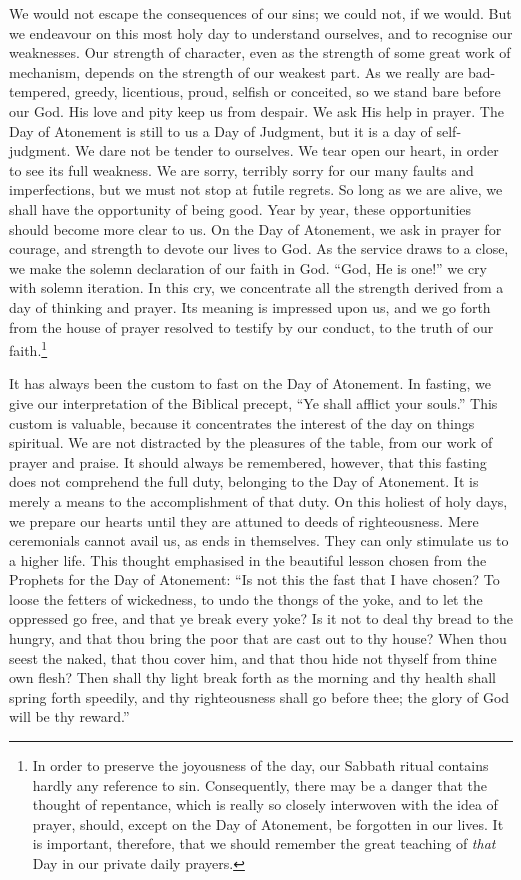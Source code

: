 We would not escape the consequences of
our sins; we could not, if we would. But
we endeavour on this most holy day to understand
ourselves, and to recognise our
weaknesses. Our strength of character, even as
the strength of some great work of mechanism,
depends on the strength of our weakest part.
As we really are bad-tempered, greedy,
licentious, proud, selfish or conceited, so we
stand bare before our God. His love and
pity keep us from despair. We ask His
help in prayer. The Day of Atonement is
still to us a Day of Judgment, but it is a day
of self-judgment. We dare not be tender to
ourselves. We tear open our heart, in order
to see its full weakness. We are sorry,
terribly sorry for our many faults and imperfections,
but we must not stop at futile
regrets. So long as we are alive, we shall
have the opportunity of being good. Year by
year, these opportunities should become more
clear to us. On the Day of Atonement, we
ask in prayer for courage, and strength to
devote our lives to God. As the service
draws to a close, we make the solemn
declaration of our faith in God. “God, He
is one!” we cry with solemn iteration. In
this cry, we concentrate all the strength
derived from a day of thinking and prayer.
Its meaning is impressed upon us, and we
go forth from the house of prayer resolved
to testify by our conduct, to the truth of
our faith.\footnote{In order to preserve the
joyousness of the day, our Sabbath ritual
contains hardly any reference to sin. Consequently,
there may be a danger that the thought of repentance,
which is really so closely interwoven with the idea of
prayer, should, except on the Day of Atonement, be forgotten
in our lives. It is important, therefore, that we should remember
the great teaching of \textsl{that} Day in our private daily
prayers.}

It has always been the custom to fast on the
Day of Atonement. In fasting, we give our interpretation
of the Biblical precept, “Ye shall
afflict your souls.” This custom is valuable,
because it concentrates the interest of the day
on things spiritual. We are not distracted
by the pleasures of the table, from our work
of prayer and praise. It should always be
remembered, however, that this fasting does
not comprehend the full duty, belonging to
the Day of Atonement. It is merely a
means to the accomplishment of that duty.
On this holiest of holy days, we prepare our
hearts until they are attuned to deeds of
righteousness. Mere ceremonials cannot
avail us, as ends in themselves. They can
only stimulate us to a higher life. This thought
emphasised in the beautiful lesson chosen
from the Prophets for the Day of Atonement:
“Is not this the fast that I have chosen? To
loose the fetters of wickedness, to undo the
thongs of the yoke, and to let the oppressed
go free, and that ye break every yoke? Is it
not to deal thy bread to the hungry, and that
thou bring the poor that are cast out to thy
house? When thou seest the naked, that
thou cover him, and that thou hide not
thyself from thine own flesh? Then shall
thy light break forth as the morning and thy
health shall spring forth speedily, and thy
righteousness shall go before thee; the glory
of God will be thy reward.”

